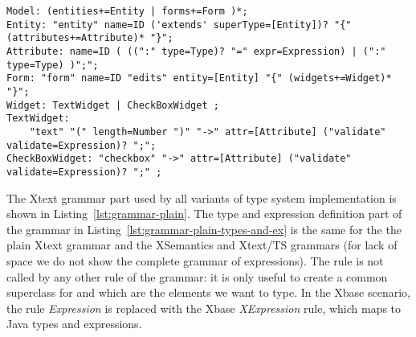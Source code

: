 % 

%

\begin{lstlisting}[language=xtext,float,label=lst:grammar-plain,caption=Grammar
of case study DSL.] 
Model: (entities+=Entity | forms+=Form )*;
Entity: "entity" name=ID ('extends' superType=[Entity])? "{" (attributes+=Attribute)* "}";
Attribute: name=ID ( ((":" type=Type)? "=" expr=Expression) | (":" type=Type) )";";
Form: "form" name=ID "edits" entity=[Entity] "{" (widgets+=Widget)* "}";
Widget: TextWidget | CheckBoxWidget ;
TextWidget:
	"text" "(" length=Number ")" "->" attr=[Attribute] ("validate" validate=Expression)? ";";
CheckBoxWidget: "checkbox" "->" attr=[Attribute] ("validate" validate=Expression)? ";" ;
\end{lstlisting}

The Xtext grammar part used by all variants of type system implementation is
shown in Listing~\ref{lst:grammar-plain}. The type and expression definition
part of the grammar in Listing~\ref{lst:grammar-plain-types-and-ex} is the same
for the the plain Xtext grammar and the XSemantics and Xtext/TS grammars (for lack of space we
do not show the complete grammar of expressions).
The rule  is not called by any other rule of the grammar: it is
only useful to create a common superclass for  and
 which are the elements we want to type.
In the Xbase scenario, the rule \emph{Expression} is replaced with the Xbase
\emph{XExpression} rule, which maps to Java types and expressions.

